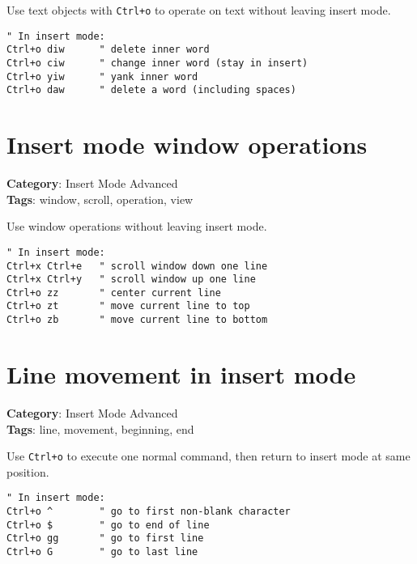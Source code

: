 {{{{{Use text objects with {\footnotesize \Verb§Ctrl+o§} to operate on text without leaving insert mode.

\begin{Exa*}{}
\begin{Verbatim}[fontsize=\footnotesize, breaklines, breakanywhere]
" In insert mode:
Ctrl+o diw      " delete inner word
Ctrl+o ciw      " change inner word (stay in insert)
Ctrl+o yiw      " yank inner word
Ctrl+o daw      " delete a word (including spaces)
\end{Verbatim}
\end{Exa*}

\section{Insert mode window operations}

\textbf{Category}: Insert Mode Advanced\\ \textbf{Tags}: window, scroll, operation, view
\vspace{0.5cm}

Use window operations without leaving insert mode.

\begin{Exa*}{}
\begin{Verbatim}[fontsize=\footnotesize, breaklines, breakanywhere]
" In insert mode:
Ctrl+x Ctrl+e   " scroll window down one line
Ctrl+x Ctrl+y   " scroll window up one line  
Ctrl+o zz       " center current line
Ctrl+o zt       " move current line to top
Ctrl+o zb       " move current line to bottom
\end{Verbatim}
\end{Exa*}

\section{Line movement in insert mode}

\textbf{Category}: Insert Mode Advanced\\ \textbf{Tags}: line, movement, beginning, end
\vspace{0.5cm}

Use {\footnotesize \Verb§Ctrl+o§} to execute one normal command, then return to insert mode at same position.

\begin{Exa*}{}
\begin{Verbatim}[fontsize=\footnotesize, breaklines, breakanywhere]
" In insert mode:
Ctrl+o ^        " go to first non-blank character
Ctrl+o $        " go to end of line
Ctrl+o gg       " go to first line
Ctrl+o G        " go to last line
\end{Verbatim}
\end{Exa*}

}}}}}
